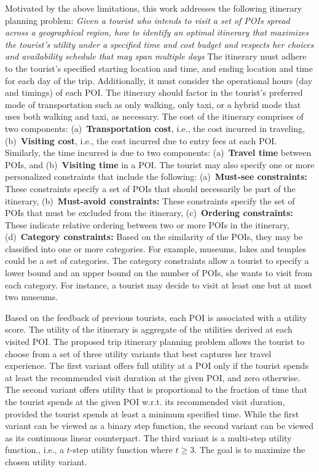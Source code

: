 Motivated by the above limitations, this work addresses the following itinerary planning problem: \emph{Given a tourist who intends to visit a set of POIs spread across a geographical region, how to identify an optimal itinerary that maximizes the tourist's utility under a specified time and cost budget and respects her choices and availability schedule that may span multiple days} The itinerary must adhere to the tourist's specified starting location and time, and ending location and time for each day of the trip. Additionally, it must consider the operational hours (day and timings) of each POI. The itinerary should factor in the tourist's preferred mode of transportation such as only walking, only taxi, or a hybrid mode that uses both walking and taxi, as necessary. The cost of the itinerary comprises of two components: (a)~\textbf{Transportation cost}, i.e., the cost incurred in traveling, (b)~\textbf{Visiting cost}, i.e., the cost incurred due to entry fees at each POI. Similarly, the time incurred is due to two components: (a)~\textbf{Travel time} between POIs, and (b)~\textbf{Visiting time} in a POI. The tourist may also specify one or more personalized constraints that include the following: (a)~\textbf{Must-see constraints:} These constraints specify a set of POIs that should necessarily be part of the itinerary, (b)~\textbf{Must-avoid constraints:} These constraints specify the set of POIs that must be excluded from the itinerary, (c)~\textbf{Ordering constraints:} These indicate relative ordering between two or more POIs in the itinerary, (d)~\textbf{Category constraints:} Based on the similarity of the POIs, they may be classified into one or more categories. For example, museums, lakes and temples could be a set of categories. The category constraints allow a tourist to specify a lower bound and an upper bound on the number of POIs, she wants to visit from each category. For instance, a tourist may decide to visit at least one but at most two museums. 

Based on the feedback of previous tourists, each POI is associated with a utility score. 
The utility of the itinerary is aggregate of the utilities derived at each visited POI. The proposed trip itinerary planning problem allows the tourist to choose from a set of three utility variants that best captures her travel experience. The first variant offers full utility at a POI only if the tourist spends at least the recommended visit duration at the given POI, and zero otherwise. The second variant offers utility that is proportional to the fraction of time that the tourist spends at the given POI w.r.t. its recommended visit duration, provided the tourist  spends at least a minimum specified time. While the first variant can be viewed as a binary step function, the second variant can be viewed as its continuous linear counterpart. The third variant is a multi-step utility function., i.e., a $t$-step utility function where $t \ge 3$. The goal is to maximize the chosen utility variant.

